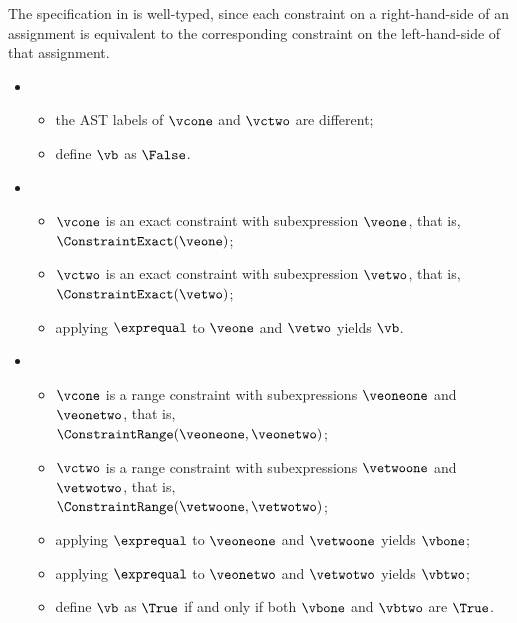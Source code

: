 The specification in  is well-typed,
since each constraint on a right-hand-side of an assignment is equivalent to the
corresponding constraint on the left-hand-side of that assignment.

\ProseParagraph
\OneApplies
\begin{itemize}
  \item {}
  \begin{itemize}
    \item the AST labels of $\vcone$ and $\vctwo$ are different;
    \item define $\vb$ as $\False$.
  \end{itemize}

  \item {}
  \begin{itemize}
    \item $\vcone$ is an exact constraint with subexpression $\veone$, that is, $\ConstraintExact(\veone)$;
    \item $\vctwo$ is an exact constraint with subexpression $\vetwo$, that is, $\ConstraintExact(\vetwo)$;
    \item applying $\exprequal$ to $\veone$ and $\vetwo$ yields $\vb$\ProseOrTypeError.
  \end{itemize}

  \item {}
  \begin{itemize}
    \item $\vcone$ is a range constraint with subexpressions $\veoneone$ and $\veonetwo$, that is, \\ $\ConstraintRange(\veoneone, \veonetwo)$;
    \item $\vctwo$ is a range constraint with subexpressions $\vetwoone$ and $\vetwotwo$, that is, \\ $\ConstraintRange(\vetwoone, \vetwotwo)$;
    \item applying $\exprequal$ to $\veoneone$ and $\vetwoone$ yields $\vbone$\ProseOrTypeError;
    \item applying $\exprequal$ to $\veonetwo$ and $\vetwotwo$ yields $\vbtwo$\ProseOrTypeError;
    \item define $\vb$ as $\True$ if and only if both $\vbone$ and $\vbtwo$ are $\True$.
  \end{itemize}
\end{itemize}

